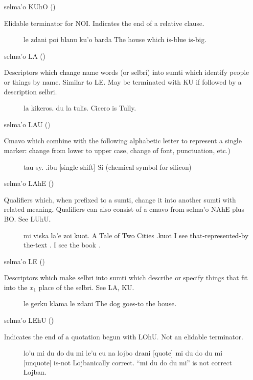 selma'o KUhO () 

Elidable terminator for NOI. Indicates the end of a relative
    clause.
\begin{description}
\item[] le zdani poi blanu ku'o barda The house which is-blue is-big.
\end{description}

selma'o LA () 

Descriptors which change name words (or selbri) into sumti
    which identify people or things by name. Similar to LE. May be
    terminated with KU if followed by a description selbri.
\begin{description}
\item[] la kikeros. du la tulis. Cicero is Tully.
\end{description}

selma'o LAU () 

Cmavo which combine with the following alphabetic letter to
    represent a single marker: change from lower to upper case,
    change of font, punctuation, etc.)
\begin{description}
\item[] tau sy. .ibu [single-shift]   Si (chemical symbol for silicon)
\end{description}

selma'o LAhE () 

Qualifiers which, when prefixed to a sumti, change it into
    another sumti with related meaning. Qualifiers can also consist
    of a cmavo from selma'o NAhE plus BO. See LUhU.
\begin{description}
\item[] mi viska la'e zoi kuot. A Tale of Two Cities .kuot I see that-represented-by the-text . I see the book .
\end{description}

selma'o LE () 

Descriptors which make selbri into sumti which describe or
    specify things that fit into the $x_1$ place of the selbri. See
    LA, KU.
\begin{description}
\item[] le gerku klama le zdani The dog goes-to the house.
\end{description}

selma'o LEhU () 

Indicates the end of a quotation begun with LOhU. Not an
    elidable terminator.
\begin{description}
\item[] lo'u mi du do du mi le'u cu na lojbo drani [quote] mi du do du mi [unquote] is-not Lojbanically correct. ``mi du do du mi'' is not correct Lojban.
\end{description}

